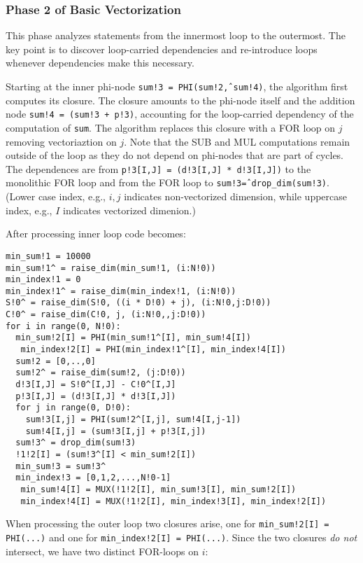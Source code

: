 \subsubsection{Phase 2 of Basic Vectorization}

This phase analyzes statements from the innermost loop to the outermost. The key point is to discover loop-carried dependencies and re-introduce loops whenever dependencies make this necessary.

Starting at the inner phi-node \texttt{sum!3 = PHI(sum!2\^, sum!4)}, the algorithm first computes its closure. The closure amounts to the phi-node itself and the addition node \texttt{sum!4 = (sum!3 + p!3)}, accounting for the loop-carried dependency of the computation of \texttt{sum}. The algorithm replaces this closure with a FOR loop on $j$ removing vectoriaztion on $j$. Note that the SUB and MUL computations remain outside of the loop as they do not depend on phi-nodes that are part of cycles. The dependences are from \texttt{p!3[I,J] = (d!3[I,J] * d!3[I,J])} to the monolithic FOR loop and from the FOR loop to \texttt{sum!3\^ = drop\_dim(sum!3)}. (Lower case index, e.g., $i,j$ indicates non-vectorized dimension, while uppercase index, e.g., $I$ indicates vectorized dimenion.)

After processing inner loop code becomes:

\begin{verbatim}
min_sum!1 = 10000
min_sum!1^ = raise_dim(min_sum!1, (i:N!0))
min_index!1 = 0
min_index!1^ = raise_dim(min_index!1, (i:N!0))
S!0^ = raise_dim(S!0, ((i * D!0) + j), (i:N!0,j:D!0))
C!0^ = raise_dim(C!0, j, (i:N!0,,j:D!0))
for i in range(0, N!0):
  min_sum!2[I] = PHI(min_sum!1^[I], min_sum!4[I]) 
   min_index!2[I] = PHI(min_index!1^[I], min_index!4[I])  
  sum!2 = [0,..,0] 
  sum!2^ = raise_dim(sum!2, (j:D!0))
  d!3[I,J] = S!0^[I,J] - C!0^[I,J]
  p!3[I,J] = (d!3[I,J] * d!3[I,J])
  for j in range(0, D!0):
    sum!3[I,j] = PHI(sum!2^[I,j], sum!4[I,j-1])       
    sum!4[I,j] = (sum!3[I,j] + p!3[I,j])
  sum!3^ = drop_dim(sum!3)     
  !1!2[I] = (sum!3^[I] < min_sum!2[I])
  min_sum!3 = sum!3^
  min_index!3 = [0,1,2,...,N!0-1]
   min_sum!4[I] = MUX(!1!2[I], min_sum!3[I], min_sum!2[I])
   min_index!4[I] = MUX(!1!2[I], min_index!3[I], min_index!2[I])
\end{verbatim}

\noindent When processing the outer loop two closures arise, one for \texttt{min\_sum!2[I] = PHI(...)} and one 
for \texttt{min\_index!2[I] = PHI(...)}. Since the two closures \emph{do not} intersect, we have two distinct FOR-loops on $i$:

